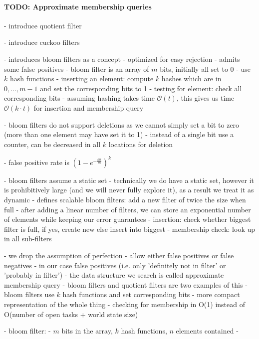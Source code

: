 \paragraph{TODO: Approximate membership queries}
\cite{bender2011don}
- introduce quotient filter

\cite{fan2014cuckoo}
- introduce cuckoo filters

\cite{bloom1970space}
- introduces bloom filters as a concept
- optimized for easy rejection
- admits some false positives
- bloom filter is an array of $m$ bits, initially all set to 0
- use $k$ hash functions
- inserting an element: compute $k$ hashes which are in $0, \ldots, m - 1$ and set the corresponding bits to 1
- testing for element: check all corresponding bits
- assuming hashing takes time $\mathcal{O}(t)$, this gives us time $\mathcal{O}(k \cdot t)$ for insertion and membership query

- bloom filters do not support deletions as we cannot simply set a bit to zero (more than one element may have set it to 1)
\cite{fan2000summary}
- instead of a single bit use a counter, can be decreased in all $k$ locations for deletion

\cite{broder2004network}
- false positive rate is $(1 - e^{-\frac{kn}{m}})^k$

\cite{xie2007scalable}
- bloom filters assume a static set
- technically we do have a static set, however it is prohibitively large (and we will never fully explore it), as a result we treat it as dynamic
- defines scalable bloom filters: add a new filter of twice the size when full
- after adding a linear number of filters, we can store an exponential number of elements while keeping our error guarantees
- insertion: check whether biggest filter is full, if yes, create new else insert into biggest
- membership check: look up in all sub-filters


- we drop the assumption of perfection
- allow either false positives or false negatives
- in our case false positives (i.e. only 'definitely not in filter' or 'probably in filter')
- the data structure we search is called approximate membership query
- bloom filters and quotient filters are two examples of this
- bloom filters use $k$ hash functions and set corresponding bits
- more compact representation of the whole thing
- checking for membership in O(1) instead of O(number of open tasks + world state size)

- bloom filter:
- $m$ bits in the array, $k$ hash functions, $n$ elements contained
- 

